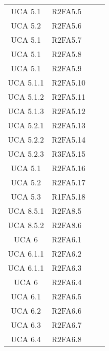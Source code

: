 {\begin{longtable}{ c C{4cm} c c}
UCA 5.1 & R2FA5.5\\

UCA 5.2 & R2FA5.6\\

UCA 5.1 & R2FA5.7\\

UCA 5.1 & R2FA5.8\\

UCA 5.1 & R2FA5.9\\

UCA 5.1.1 & R2FA5.10\\

UCA 5.1.2 & R2FA5.11\\


UCA 5.1.3 & R2FA5.12\\

UCA 5.2.1 & R2FA5.13\\

UCA 5.2.2 & R2FA5.14\\

UCA 5.2.3 & R3FA5.15\\

UCA 5.1 & R2FA5.16\\

UCA 5.2 & R2FA5.17\\

UCA 5.3 & R1FA5.18\\

UCA 8.5.1 & R2FA8.5\\

UCA 8.5.2 & R2FA8.6\\

UCA 6 & R2FA6.1\\


UCA 6.1.1 & R2FA6.2\\

UCA 6.1.1 & R2FA6.3\\

UCA 6 & R2FA6.4\\

UCA 6.1 & R2FA6.5\\

UCA 6.2 & R2FA6.6\\

UCA 6.3 & R2FA6.7\\

UCA 6.4 & R2FA6.8\\



\end{longtable}}
